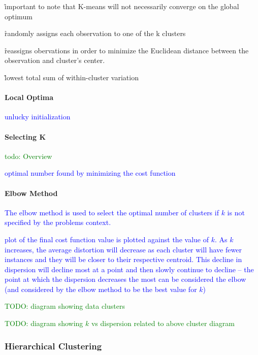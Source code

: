 
\r{important to note that K-means will not necessarily converge on the global optimum}

\r{randomly assigns each observation to one of the k clusters}

\r{reassigns obervations in order to minimize the Euclidean distance between the observation and cluster's center.}

\r{lowest total sum of within-cluster variation}


\paragraph{Local Optima}

\textcolor{blue}{unlucky initialization}

\paragraph{Selecting K}

\textcolor{green}{todo: Overview}

\textcolor{blue}{optimal number found by minimizing the cost function}

\paragraph{Elbow Method}

\textcolor{blue}{The elbow method is used to select the optimal number of clusters if $k$ is not specified by the problems context.}

\textcolor{blue}{plot of the final cost function value is plotted against the value of $k$. As $k$ increases, the average distortion will decrease as each cluster will have fewer instances and they will be closer to their respective centroid. This decline in dispersion will decline most at a point and then slowly continue to decline -- the point at which the dispersion decreases the most can be considered the elbow (and considered by the elbow method to be the best value for $k$)}

\textcolor{green}{TODO: diagram showing data clusters}

\textcolor{green}{TODO: diagram showing $k$ vs dispersion related to above cluster diagram}


\subsubsection{Hierarchical Clustering}

